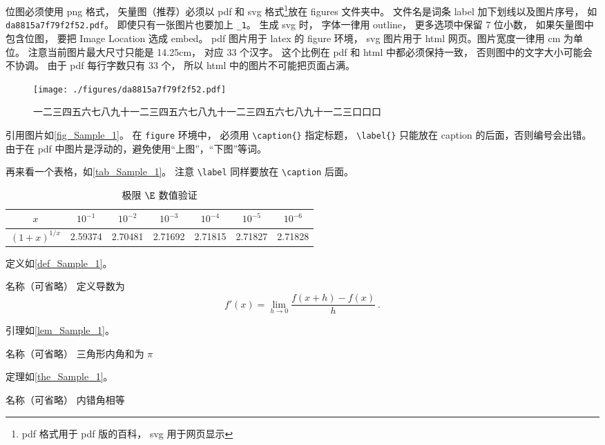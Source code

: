 位图必须使用 png 格式， 矢量图（推荐）必须以 pdf 和 svg 格式\footnote{pdf 格式用于 pdf 版的百科， svg 用于网页显示}放在 figures 文件夹中。 文件名是词条 label 加下划线以及图片序号， 如 \verb|da8815a7f79f2f52.pdf|。 即使只有一张图片也要加上 \verb|_1|。 生成 svg 时， 字体一律用 outline， 更多选项中保留 7 位小数， 如果矢量图中包含位图， 要把 Image Location 选成 embed。 pdf 图片用于 latex 的 figure 环境， svg 图片用于 html 网页。图片宽度一律用 cm 为单位。 注意当前图片最大尺寸只能是 14.25cm， 对应 33 个汉字。 这个比例在 pdf 和 html 中都必须保持一致， 否则图中的文字大小可能会不协调。 由于 pdf 每行字数只有 33 个， 所以 html 中的图片不可能把页面占满。
\begin{figure}[ht]
\centering
\texttt{[image: ./figures/da8815a7f79f2f52.pdf]}
\caption{一二三四五六七八九十一二三四五六七八九十一二三四五六七八九十一二三口口口} \label{fig_Sample_1}
\end{figure}
引用图片如\autoref{fig_Sample_1}。 在 \verb|figure| 环境中， 必须用 \verb|\caption{}| 指定标题， \verb|\label{}| 只能放在 caption 的后面，否则编号会出错。由于在 pdf 中图片是浮动的，避免使用“上图”，“下图”等词。

再来看一个表格，如\autoref{tab_Sample_1}。 注意 \verb|\label| 同样要放在 \verb|\caption| 后面。
\begin{table}[ht]
\centering
\caption{极限 $\E$ 数值验证}\label{tab_Sample_1}
\begin{tabular}{|c|c|c|c|c|c|c|}
\hline
$x$ & ${10^{ - 1}}$ & ${10^{ - 2}}$ & ${10^{ - 3}}$ & ${10^{ - 4}}$ & ${10^{ - 5}}$ & ${10^{ - 6}}$ \\
\hline
$(1 + x)^{1/x}$ & 2.59374 & 2.70481 & 2.71692 & 2.71815 & 2.71827 & 2.71828 \\
\hline
\end{tabular}
\end{table}

定义如\autoref{def_Sample_1}。
\begin{definition}{名称（可省略）}\label{def_Sample_1}
定义导数为
\begin{equation}
f'(x) = \lim_{h \to 0} \frac{f(x + h) - f(x)}{h}~.
\end{equation}
\end{definition}

引理如\autoref{lem_Sample_1}。
\begin{lemma}{名称（可省略）}\label{lem_Sample_1}
三角形内角和为 $\pi$
\end{lemma}

定理如\autoref{the_Sample_1}。
\begin{theorem}{名称（可省略）}\label{the_Sample_1}
内错角相等
\end{theorem}


